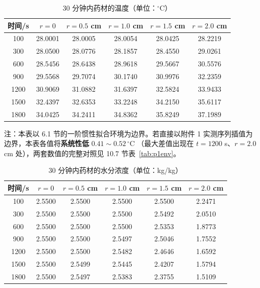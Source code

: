 \begin{table}[htbp]
\centering
\caption{30 分钟内药材的温度（单位：$^\circ$C）}
\label{tab:p1T}
\footnotesize
\begin{tabular}{cccccc}
\toprule[1.5pt]
时间/s & $r=0$ & $r=0.5$ cm & $r=1.0$ cm & $r=1.5$ cm & $r=2.0$ cm \\
\midrule[1pt]
100  & 28.0001 & 28.0005 & 28.0054 & 28.0425 & 28.2219 \\
300  & 28.0500 & 28.0776 & 28.1857 & 28.4550 & 29.0261 \\
600  & 28.5456 & 28.6438 & 28.9618 & 29.5667 & 30.5576 \\
900  & 29.5568 & 29.7074 & 30.1740 & 30.9976 & 32.2359 \\
1200 & 30.9069 & 31.0882 & 31.6397 & 32.5824 & 33.9433 \\
1500 & 32.4397 & 32.6353 & 33.2248 & 34.2150 & 35.6117 \\
1800 & 34.0425 & 34.2411 & 34.8362 & 35.8249 & 37.1989 \\
\bottomrule[1.5pt]
\end{tabular}

\vspace{2pt}
{\footnotesize 注：本表以 6.1 节的一阶惯性拟合环境为边界。若直接以附件 1
实测序列插值为边界，本表各值将\textbf{系统性低} $0.41\!\sim\!0.52\,^\circ$C
（最大差值出现在 $t=1200$ s、$r=2.0$ cm 处），两套数值的完整对照见
10.7 节表~\ref{tab:p1env}。}
\end{table}

\begin{table}[htbp]
\centering
\caption{30 分钟内药材的水分浓度（单位：kg/kg）}
\label{tab:p1C}
\footnotesize
\begin{tabular}{cccccc}
\toprule[1.5pt]
时间/s & $r=0$ & $r=0.5$ cm & $r=1.0$ cm & $r=1.5$ cm & $r=2.0$ cm \\
\midrule[1pt]
100  & 2.5500 & 2.5500 & 2.5500 & 2.5500 & 2.2471 \\
300  & 2.5500 & 2.5500 & 2.5500 & 2.5492 & 2.0510 \\
600  & 2.5500 & 2.5500 & 2.5500 & 2.5353 & 1.8773 \\
900  & 2.5500 & 2.5500 & 2.5497 & 2.5046 & 1.7552 \\
1200 & 2.5500 & 2.5500 & 2.5482 & 2.4646 & 1.6592 \\
1500 & 2.5500 & 2.5499 & 2.5445 & 2.4207 & 1.5794 \\
1800 & 2.5500 & 2.5497 & 2.5383 & 2.3755 & 1.5109 \\
\bottomrule[1.5pt]
\end{tabular}
\end{table}

